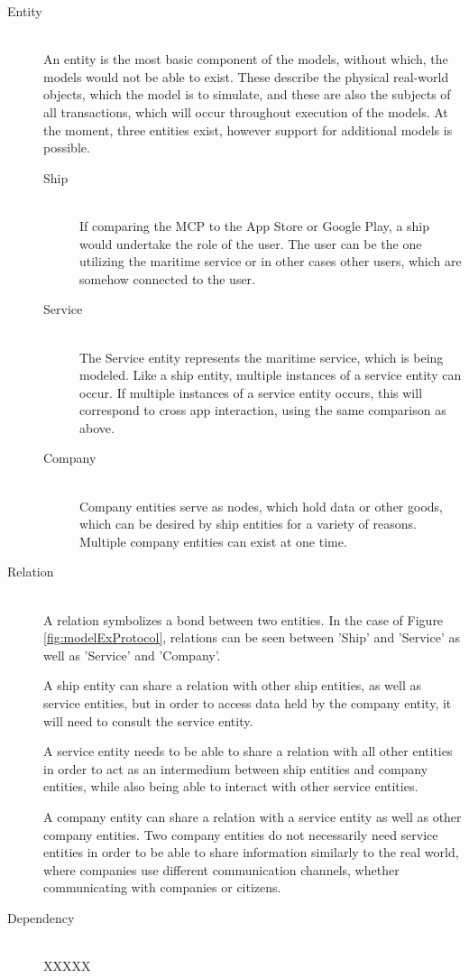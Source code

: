\begin{description}
	\item[Entity]\ \\
	An entity is the most basic component of the models, without which, the models would not be able to exist. These describe the physical real-world objects, which the model is to simulate, and these are also the subjects of all transactions, which will occur throughout execution of the models. At the moment, three entities exist, however support for additional models is possible.
	\begin{description}
		\item[Ship]\ \\
		If comparing the MCP to the App Store or Google Play, a ship would undertake the role of the user. The user can be the one utilizing the maritime service or in other cases other users, which are somehow connected to the user. 
		\item[Service]\ \\
		The Service entity represents the maritime service, which is being modeled. Like a ship entity, multiple instances of a service entity can occur. If multiple instances of a service entity occurs, this will correspond to cross app interaction, using the same comparison as above.
		\item[Company]\ \\
		Company entities serve as nodes, which hold data or other goods, which can be desired by ship entities for a variety of reasons. Multiple company entities can exist at one time. 
	\end{description}
	\item[Relation]\ \\
	A relation symbolizes a bond between two entities. In the case of Figure \ref{fig:modelExProtocol}, relations can be seen between 'Ship' and 'Service' as well as 'Service' and 'Company'.

	A ship entity can share a relation with other ship entities, as well as service entities, but in order to access data held by the company entity, it will need to consult the service entity.

	A service entity needs to be able to share a relation with all other entities in order to act as an intermedium between ship entities and company entities, while also being able to interact with other service entities.

	A company entity can share a relation with a service entity as well as other company entities. Two company entities do not necessarily need service entities in order to be able to share information similarly to the real world, where companies use different communication channels, whether communicating with companies or citizens.
	\item[Dependency]\ \\
	XXXXX
\end{description}

